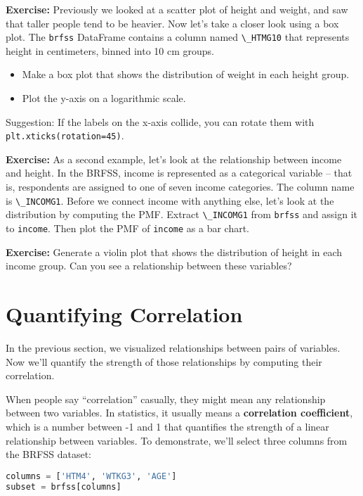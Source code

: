 \textbf{Exercise:} Previously we looked at a scatter plot of height and
weight, and saw that taller people tend to be heavier. Now let's take a
closer look using a box plot. The \passthrough{\lstinline!brfss!}
DataFrame contains a column named \passthrough{\lstinline!\_HTMG10!}
that represents height in centimeters, binned into 10 cm groups.

\begin{itemize}
\item
  Make a box plot that shows the distribution of weight in each height
  group.
\item
  Plot the y-axis on a logarithmic scale.
\end{itemize}

Suggestion: If the labels on the x-axis collide, you can rotate them
with \passthrough{\lstinline!plt.xticks(rotation=45)!}.

\textbf{Exercise:} As a second example, let's look at the relationship
between income and height. In the BRFSS, income is represented as a
categorical variable -- that is, respondents are assigned to one of
seven income categories. The column name is
\passthrough{\lstinline!\_INCOMG1!}. Before we connect income with
anything else, let's look at the distribution by computing the PMF.
Extract \passthrough{\lstinline!\_INCOMG1!} from
\passthrough{\lstinline!brfss!} and assign it to
\passthrough{\lstinline!income!}. Then plot the PMF of
\passthrough{\lstinline!income!} as a bar chart.

\textbf{Exercise:} Generate a violin plot that shows the distribution of
height in each income group. Can you see a relationship between these
variables?

\section{Quantifying Correlation}\label{quantifying-correlation}

In the previous section, we visualized relationships between pairs of
variables. Now we'll quantify the strength of those relationships by
computing their correlation.

When people say ``correlation'' casually, they might mean any
relationship between two variables. In statistics, it usually means a
\textbf{correlation coefficient}, which is a number between -1 and 1
that quantifies the strength of a linear relationship between variables.
To demonstrate, we'll select three columns from the BRFSS dataset:

\begin{lstlisting}[language=Python,style=source]
columns = ['HTM4', 'WTKG3', 'AGE']
subset = brfss[columns]
\end{lstlisting}

